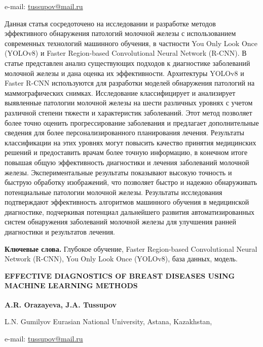 e-mail: \href{mailto:oaris.83@gmail.com}{tussupov@mail.ru}

Данная статья сосредоточено на исследовании и разработке методов
эффективного обнаружения патологий молочной железы с использованием
современных технологий машинного обучения, в частности You Only Look
Once (YOLOv8) и Faster Region-based Convolutional Neural Network
(R-CNN). В статье представлен анализ существующих подходов к диагностике
заболеваний молочной железы и дана оценка их эффективности. Архитектуры
YOLOv8 и Faster R-CNN используются для разработки моделей обнаружения
патологий на маммографических снимках. Исследование классифицирует и
анализирует выявленные патологии молочной железы на шести различных
уровнях с учетом различной степени тяжести и характеристик заболеваний.
Этот метод позволяет более точно оценить прогрессирование заболевания и
предлагает дополнительные сведения для более персонализированного
планирования лечения. Результаты классификации на этих уровнях могут
повысить качество принятия медицинских решений и предоставить врачам
более точную информацию, в конечном итоге повышая общую эффективность
диагностики и лечения заболеваний молочной железы. Экспериментальные
результаты показывают высокую точность и быструю обработку изображений,
что позволяет быстро и надежно обнаруживать потенциальные патологии
молочной железы. Результаты исследования подтверждают эффективность
алгоритмов машинного обучения в медицинской диагностике, подчеркивая
потенциал дальнейшего развития автоматизированных систем обнаружения
заболеваний молочной железы для улучшения ранней диагностики и
результатов лечения.

{\bfseries Ключевые слова.} Глубокое обучение, Faster Region-based
Convolutional Neural Network (R-CNN), You Only Look Once (YOLOv8), база
данных, модель.

{\bfseries EFFECTIVE DIAGNOSTICS OF BREAST DISEASES USING MACHINE LEARNING
METHODS}

{\bfseries A.R. Orazayeva, J.A. Tussupov\textsuperscript{\envelope }}

L.N. Gumilyov Eurasian National University, Astana, Kazakhstan,

e-mail: \href{mailto:oaris.83@gmail.com}{tussupov@mail.ru}


